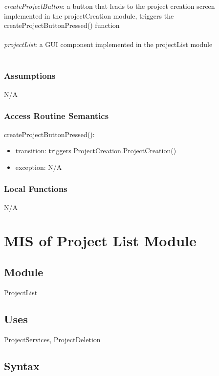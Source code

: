 \documentclass[12pt, titlepage]{article}
\begin{document}
	\textit{createProjectButton}: a button that leads to the project creation screen implemented in the projectCreation module, triggers the createProjectButtonPressed() function \\\\ 
	\textit{projectList}: a GUI component implemented in the projectList module \\\\
	
	\subsubsection{Assumptions}
	N/A
	
	\subsubsection{Access Routine Semantics}
	
	\noindent createProjectButtonPressed():
	\begin{itemize}
		\item transition: triggers ProjectCreation.ProjectCreation()
		\item exception: N/A
	\end{itemize}
	
	\subsubsection{Local Functions}
	
	N/A
	
	\newpage
	
	\section{MIS of Project List Module} \label{Module} 
	
	\subsection{Module}
	
	ProjectList
	
	\subsection{Uses}
	ProjectServices, ProjectDeletion
	
	\subsection{Syntax}
	
\end{document}
